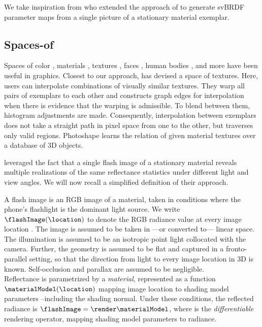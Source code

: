 \documentclass[acmtog, review, anonymous]{acmart}
\begin{document}
We take inspiration from \citet{aittala2016reflectance} who extended the approach of \citet{gatys2015texture} to generate \ac{svBRDF} parameter maps from a single picture of a stationary material exemplar.

\subsection{Spaces-of}
Spaces of color \cite{nguyen2015data}, materials \cite{matusik2003data}, textures \cite{matusik2005texture}, faces \cite{blanz1999morphable}, human bodies \cite{allen2003space}, and more have been useful in graphics.
% 
Closest to our approach, \citet{matusik2005texture} has devised a space of textures.
Here, users can interpolate combinations of visually similar textures.
They warp all pairs of exemplars to each other and constructs graph edges for interpolation when there is evidence that the warping is admissible.
To blend between them, histogram adjustments are made.
Consequently, interpolation between exemplars does not take a straight path in pixel space from one to the other, but traverses only valid regions.
Photoshape \cite{park2019photoshape} learns the relation of given material textures over a database of 3D objects.


\citet{aittala2016reflectance} leveraged the fact that a single flash image of a stationary material reveals multiple realizations of the same reflectance statistics under different light and view angles.
We will now recall a simplified definition of their approach. 

A flash image is an RGB image of a material, taken in conditions where the phone's flashlight is the dominant light source.
We write $\flashImage(\location)$ to denote the RGB radiance value at every image location \location.
The image is assumed to be taken in ---or converted to--- linear space.
The illumination is assumed to be an isotropic point light collocated with the camera.
Further, the geometry is assumed to be flat and captured in a fronto-parallel setting, so that the direction from light to every image location in 3D is known.
Self-occlusion and parallax are assumed to be negligible.\\
Reflectance is parametrized by a \emph{material}, represented as a function $\materialModel(\location)$ mapping image location \location to shading model parameters --including the shading normal.
Under these conditions, the reflected radiance is
$
\flashImage=\render\materialModel
$, where \render is the \emph{differentiable} rendering operator, mapping shading model parameters to radiance.
\end{document}
